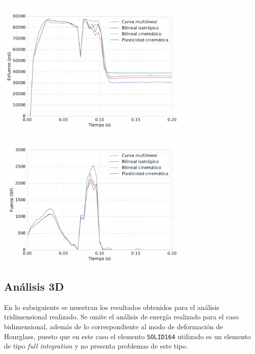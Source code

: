 \begin{center}
\includegraphics[width=0.75\textwidth]{src/ch4/mdm_von_mises.pdf}
\label{fig:mdm_von_mises}
\end{center}

\begin{center}
\includegraphics[width=0.75\textwidth]{src/ch4/mdm_force.pdf}
\label{fig:mdm_force}
\end{center}

\subsection{Análisis 3D}

En lo subsiguiente se muestran los resultados obtenidos para el análisis tridimensional 
realizado. Se omite el análisis de energía realizado para el caso bidimensional, además 
de lo correspondiente al modo de deformación de Hourglass, puesto que en este caso el 
elemento \texttt{SOLID164} utilizado es un elemento de tipo \textit{full integration} y 
no presenta problemas de este tipo.

